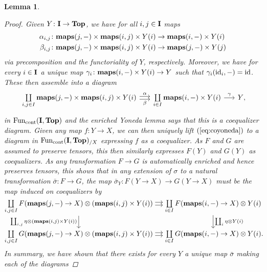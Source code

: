 \documentclass[reqno]{memo-l}
\theoremstyle{mythm}
\newtheorem{lemma}[thm]{Lemma}
\theoremstyle{definition}
\numberwithin{equation}{section}
\newcommand{\Fun}{{\textup{Fun}}}
\newcommand{\cat}[1]{\textbf{\textup{#1}}}
\newcommand{\maps}{\cat{maps}}
\newcommand{\id}{\textup{id}}
\newcommand{\cont}{\textup{cont}}
\begin{document}
\begin{lemma}
\begin{proof}
        Given $Y\colon\cat{I}\to\cat{Top}$, we have for all $i,j\in\cat{I}$ maps 
        \begin{align*}
            \alpha_{i,j}\colon\maps(j,-)\times\maps(i,j)\times Y(i)&\to\maps(i,-)\times Y(i)\\
            \beta_{i,j}\colon\maps(j,-)\times\maps(i,j)\times Y(i)&\to\maps(j,-)\times Y(j)
        \end{align*}
        via precomposition and the functoriality of $Y$, respectively. Moreover, we have for every $i\in \cat{I}$ a unique map $\gamma_i\colon\maps(i,-)\times Y(i)\to Y$ such that $\gamma_i(\id_i,-)=\id$. These then assemble into a diagram
        \begin{equation}\label{eq:coyoneda}
            \begin{tikzcd}[column sep=1.5em]
                \coprod\limits_{i,j\in I} \maps(j,-)\times\maps(i,j)\times Y(i)\arrow[r, yshift=2pt,"\alpha"]\arrow[r,yshift=-2pt,"\beta"']& \coprod\limits_{i\in I} \maps(i,-)\times Y(i) \arrow[r,"\gamma"] & Y\rlap,
            \end{tikzcd}
        \end{equation}
        in $\Fun_\cont(\cat{I},\cat{Top})$ and the enriched Yoneda lemma says that this is a coequalizer diagram. Given any map $f\colon Y\to X$, we can then uniquely lift $(\ref{eq:coyoneda})$ to a diagram in $\Fun_\cont(\cat{I},\cat{Top})_{/X}$ expressing $f$ as a coequalizer. As $F$ and $G$ are assumed to preserve tensors, this then similarly expresses $F(Y)$ and $G(Y)$ as coequalizers. As any  transformation $F\to G$ is automatically enriched and hence preserves tensors, this shows that in any extension of $\sigma$ to a natural transformation $\bar\sigma\colon F\to G$, the map $\bar \sigma_Y\colon F(Y\to X)\to G(Y\to X)$ must be the map induced on coequalizers by
        \[
            \begin{tikzcd}[column sep=1.1em,cramped]
                \arrow[d,"{\coprod_{i,j}\eta\otimes (\maps(i,j)\times Y(i))}"']\coprod\limits_{i,j\in I} F(\maps(j,-)\to X)\otimes (\maps(i,j)\times Y(i))\arrow[r, yshift=2pt]\arrow[r,yshift=-2pt]& \coprod\limits_{i\in I} F(\maps(i,-)\to X)\otimes Y(i)\arrow[d,"\coprod_{i}\eta\otimes Y(i)"]\\
                \coprod\limits_{i,j\in I} G(\maps(j,-)\to X)\otimes (\maps(i,j)\times Y(i))\arrow[r, yshift=2pt]\arrow[r,yshift=-2pt]& \coprod\limits_{i\in I} G(\maps(i,-)\to X)\otimes Y(i)\rlap.
            \end{tikzcd}
        \]
        In summary, we have shown that there exists for every $Y$ a unique map $\bar\sigma$ making each of the diagrams

\end{proof}
\end{lemma}
\end{document}
